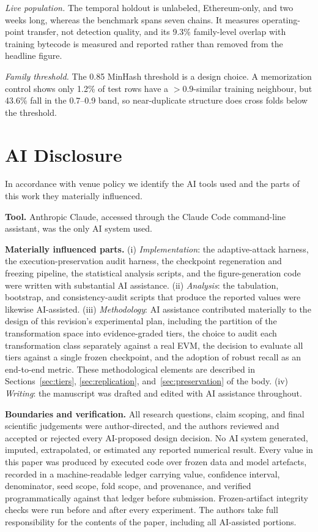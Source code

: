 \documentclass[conference]{IEEEtran}
\begin{document}
\emph{Live population.} The temporal holdout is unlabeled, Ethereum-only, and two weeks long, whereas the benchmark spans seven chains. It measures operating-point transfer, not detection quality, and its 9.3\% family-level overlap with training bytecode is measured and reported rather than removed from the headline figure.

\emph{Family threshold.} The 0.85 MinHash threshold is a design choice. A memorization control shows only 1.2\% of test rows have a $>0.9$-similar training neighbour, but 43.6\% fall in the 0.7--0.9 band, so near-duplicate structure does cross folds below the threshold.

\section{AI Disclosure}
\label{sec:ai}

In accordance with venue policy we identify the AI tools used and the parts of this work they materially influenced.

\textbf{Tool.} Anthropic Claude, accessed through the Claude Code command-line assistant, was the only AI system used.

\textbf{Materially influenced parts.} (i) \emph{Implementation}: the adaptive-attack harness, the execution-preservation audit harness, the checkpoint regeneration and freezing pipeline, the statistical analysis scripts, and the figure-generation code were written with substantial AI assistance. (ii) \emph{Analysis}: the tabulation, bootstrap, and consistency-audit scripts that produce the reported values were likewise AI-assisted. (iii) \emph{Methodology}: AI assistance contributed materially to the design of this revision's experimental plan, including the partition of the transformation space into evidence-graded tiers, the choice to audit each transformation class separately against a real EVM, the decision to evaluate all tiers against a single frozen checkpoint, and the adoption of robust recall as an end-to-end metric. These methodological elements are described in Sections~\ref{sec:tiers}, \ref{sec:replication}, and~\ref{sec:preservation} of the body. (iv) \emph{Writing}: the manuscript was drafted and edited with AI assistance throughout.

\textbf{Boundaries and verification.} All research questions, claim scoping, and final scientific judgements were author-directed, and the authors reviewed and accepted or rejected every AI-proposed design decision. No AI system generated, imputed, extrapolated, or estimated any reported numerical result. Every value in this paper was produced by executed code over frozen data and model artefacts, recorded in a machine-readable ledger carrying value, confidence interval, denominator, seed scope, fold scope, and provenance, and verified programmatically against that ledger before submission. Frozen-artifact integrity checks were run before and after every experiment. The authors take full responsibility for the contents of the paper, including all AI-assisted portions.
\end{document}
